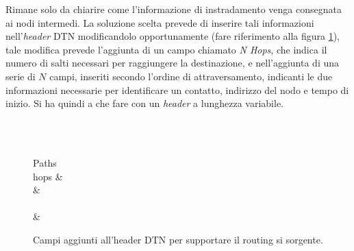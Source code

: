 \documentclass[12pt,a4paper,oneside]{book}
\begin{document}
		Rimane solo da chiarire come l'informazione di instradamento venga consegnata ai nodi intermedi. La soluzione scelta prevede di inserire tali informazioni nell'{\it header} DTN modificandolo opportunamente (fare riferimento alla figura \ref{routingheader}), tale modifica prevede l'aggiunta di un campo chiamato \emph{N Hops}, che indica il numero di salti necessari per raggiungere la destinazione, e nell'aggiunta di una serie di $N$ campi, inseriti secondo l'ordine di attraversamento, indicanti le due informazioni necessarie per identificare un contatto, indirizzo del nodo e tempo di inizio. Si ha quindi a che fare con un {\it header} a lunghezza variabile.
		
		\begin{figure}[!h]
			\centering
			
			\begin{bytefield}[bitwidth=0.5em]{64}						
				 \\
				 \\
				
				\begin{rightwordgroup}{Paths \\ hops}
					 &  \\
					 &  \\
					 \\[1ex]
					 & 
				\end{rightwordgroup}			
			\end{bytefield}
			
			\caption{Campi aggiunti all'header DTN per supportare il routing si sorgente.}
			\label{routingheader}
		\end{figure}
		
\end{document}
